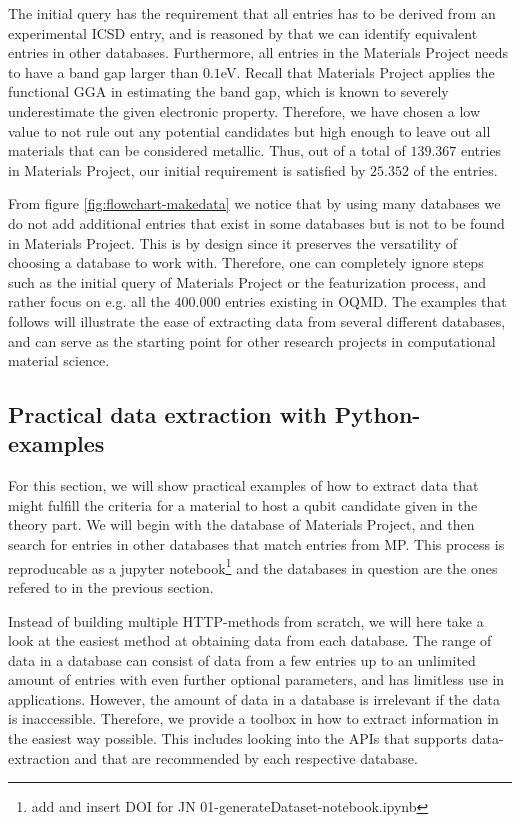 

The initial query has the requirement that all entries has to be derived from an experimental ICSD entry, and is reasoned by that we can identify equivalent entries in other databases. Furthermore, all entries in the Materials Project needs to have a band gap larger than $0.1$eV. Recall that Materials Project applies the functional GGA in estimating the band gap, which is known to severely underestimate the given electronic property. Therefore, we have chosen a low value to not rule out any potential candidates but high enough to leave out all materials that can be considered metallic. Thus, out of a total of $139.367$ entries in Materials Project, our initial requirement is satisfied by $25.352$ of the entries.

From figure \ref{fig:flowchart-makedata} we notice that by using many databases we do not add additional entries that exist in some databases but is not to be found in Materials Project. This is by design since it preserves the versatility of choosing a database to work with. Therefore, one can completely ignore steps such as the initial query of Materials Project or the featurization process, and rather focus on e.g. all the $400.000$ entries existing in OQMD. The examples that follows will illustrate the ease of extracting data from several different databases, and can serve as the starting point for other research projects in computational material science.

\subsection{Practical data extraction with Python-examples}

For this section, we will show practical examples of how to extract data that might fulfill the criteria for a material to host a qubit candidate given in the theory part. We will begin with the database of Materials Project, and then search for entries in other databases that match entries from MP. This process is reproducable as a jupyter notebook\footnote{add and insert DOI for JN 01-generateDataset-notebook.ipynb} and the databases in question are the ones refered to in the previous section.

Instead of building multiple HTTP-methods from scratch, we will here take a look at the easiest method at obtaining data from each database. The range of data in a database can consist of data from a few entries up to an unlimited amount of entries with even further optional parameters, and has limitless use in applications. However, the amount of data in a database is irrelevant if the data is inaccessible. Therefore, we provide a toolbox in how to extract information in the easiest way possible. This includes looking into the APIs that supports data-extraction and that are recommended by each respective database.

